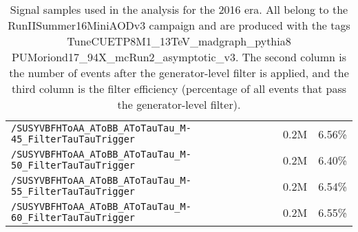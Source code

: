 \begin{table}[ht]
\begin{center}
{\begin{tabular}{|l|c|c|}
    \texttt{/SUSYVBFHToAA\_AToBB\_AToTauTau\_M-45\_FilterTauTauTrigger} & 0.2M & 6.56\%\\
    \texttt{/SUSYVBFHToAA\_AToBB\_AToTauTau\_M-50\_FilterTauTauTrigger} & 0.2M & 6.40\%\\
    \texttt{/SUSYVBFHToAA\_AToBB\_AToTauTau\_M-55\_FilterTauTauTrigger} & 0.2M & 6.54\%\\
    \texttt{/SUSYVBFHToAA\_AToBB\_AToTauTau\_M-60\_FilterTauTauTrigger} & 0.2M & 6.55\%\\
    \hline
    \end{tabular}
    }
    \end{center}
    \caption{Signal samples used in the analysis for the 2016 era. All belong to the RunIISummer16MiniAODv3 campaign and are produced with the tags TuneCUETP8M1\_13TeV\_madgraph\_pythia8 PUMoriond17\_94X\_mcRun2\_asymptotic\_v3. The second column is the number of events after the generator-level filter is applied, and the third column is the filter efficiency (percentage of all events that pass the generator-level filter).}
    \label{tab:2016signal}
    \end{table}
    
